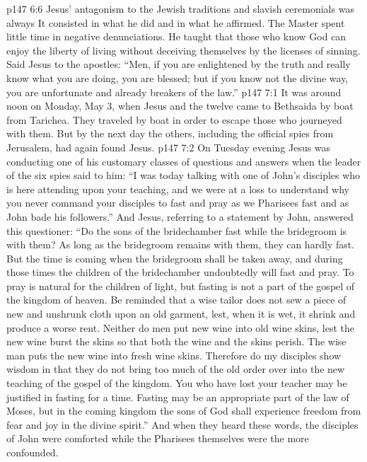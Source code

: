 \pc \vs p147 6:6 Jesus’ antagonism to the Jewish traditions and slavish ceremonials was always  It consisted in what he did and in what he affirmed. The Master spent little time in negative denunciations. He taught that those who know God can enjoy the liberty of living without deceiving themselves by the licenses of sinning. Said Jesus to the apostles: \textcolor{ubdarkred}{“Men, if you are enlightened by the truth and really know what you are doing, you are blessed; but if you know not the divine way, you are unfortunate and already breakers of the law.”}\plusone
{}
\vs p147 7:1 It was around noon on Monday, May 3, when Jesus and the twelve came to Bethsaida by boat from Tarichea. They traveled by boat in order to escape those who journeyed with them. But by the next day the others, including the official spies from Jerusalem, had again found Jesus.
\vs p147 7:2 On Tuesday evening Jesus was conducting one of his customary classes of questions and answers when the leader of the six spies said to him: “I was today talking with one of John’s disciples who is here attending upon your teaching, and we were at a loss to understand why you never command your disciples to fast and pray as we Pharisees fast and as John bade his followers.” And Jesus, referring to a statement by John, answered this questioner: \textcolor{ubdarkred}{“Do the sons of the bridechamber fast while the bridegroom is with them? As long as the bridegroom remains with them, they can hardly fast. But the time is coming when the bridegroom shall be taken away, and during those times the children of the bridechamber undoubtedly will fast and pray. To pray is natural for the children of light, but fasting is not a part of the gospel of the kingdom of heaven. Be reminded that a wise tailor does not sew a piece of new and unshrunk cloth upon an old garment, lest, when it is wet, it shrink and produce a worse rent. Neither do men put new wine into old wine skins, lest the new wine burst the skins so that both the wine and the skins perish. The wise man puts the new wine into fresh wine skins. Therefore do my disciples show wisdom in that they do not bring too much of the old order over into the new teaching of the gospel of the kingdom. You who have lost your teacher may be justified in fasting for a time. Fasting may be an appropriate part of the law of Moses, but in the coming kingdom the sons of God shall experience freedom from fear and joy in the divine spirit.”} And when they heard these words, the disciples of John were comforted while the Pharisees themselves were the more confounded.
